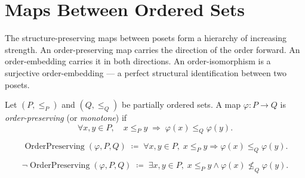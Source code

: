 
\section{Maps Between Ordered Sets}
\label{sec:maps-ordered-sets}

\begin{tcolorbox}[
  colback=gray!6,
  colframe=gray!40,
  arc=2pt,
  left=8pt, right=8pt, top=6pt, bottom=6pt,
  title={\small\textbf{Toolkit: Maps Between Ordered Sets}},
  fonttitle=\small\bfseries
]
The structure-preserving maps between posets form a hierarchy of increasing
strength.  An order-preserving map carries the direction of the order
forward.  An order-embedding carries it in both directions.  An
order-isomorphism is a surjective order-embedding — a perfect structural
identification between two posets.
\end{tcolorbox}


\begin{tcolorbox}[colback=defbox, colframe=defborder, arc=2pt,
  left=6pt, right=6pt, top=4pt, bottom=4pt,
  title={\small\textbf{Definition (Order-Preserving Map)}},
  fonttitle=\small\bfseries]
\begin{definition}
\label{def:order-preserving-map}
Let $(P, \leq_P)$ and $(Q, \leq_Q)$ be partially ordered sets.  A map
$\varphi : P \to Q$ is \emph{order-preserving} (or \emph{monotone}) if
\[
\forall x, y \in P, \quad
x \leq_P y \;\Longrightarrow\; \varphi(x) \leq_Q \varphi(y).
\]
\end{definition}
\end{tcolorbox}

\begin{remark*}
\[
\operatorname{OrderPreserving}(\varphi, P, Q)
\;\coloneqq\;
\forall x, y \in P,\;
x \leq_P y \Rightarrow \varphi(x) \leq_Q \varphi(y).
\]
\end{remark*}

\begin{remark*}
\[
\neg\operatorname{OrderPreserving}(\varphi, P, Q)
\;\coloneqq\;
\exists x, y \in P,\;
x \leq_P y \land \varphi(x) \not\leq_Q \varphi(y).
\]
\end{remark*}

